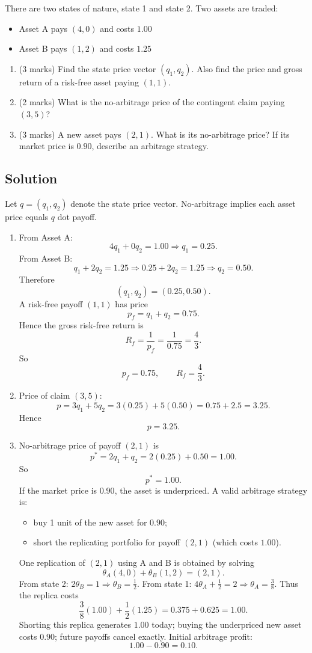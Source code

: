 \documentclass[12pt]{article}
\begin{document}
There are two states of nature, state 1 and state 2. Two assets are traded:
\begin{itemize}
\item Asset A pays $(4,0)$ and costs $1.00$
\item Asset B pays $(1,2)$ and costs $1.25$
\end{itemize}

\begin{enumerate}[label=(\alph*)]
\item (3 marks) Find the state price vector $(q_1,q_2)$. Also find the price and gross return of a risk-free asset paying $(1,1)$.
\item (2 marks) What is the no-arbitrage price of the contingent claim paying $(3,5)$?
\item (3 marks) A new asset pays $(2,1)$. What is its no-arbitrage price? If its market price is $0.90$, describe an arbitrage strategy.
\end{enumerate}

\subsection*{Solution}

Let $q=(q_1,q_2)$ denote the state price vector. No-arbitrage implies each asset price equals $q$ dot payoff.

\begin{enumerate}[label=(\alph*)]
\item From Asset A:
\[
4q_1+0q_2=1.00 \Rightarrow q_1=0.25.
\]
From Asset B:
\[
q_1+2q_2=1.25 \Rightarrow 0.25+2q_2=1.25 \Rightarrow q_2=0.50.
\]
Therefore
\[
\boxed{(q_1,q_2)=(0.25,0.50).}
\]
A risk-free payoff $(1,1)$ has price
\[
p_f=q_1+q_2=0.75.
\]
Hence the gross risk-free return is
\[
R_f=\frac{1}{p_f}=\frac{1}{0.75}=\frac43.
\]
So
\[
\boxed{p_f=0.75,\qquad R_f=\frac43.}
\]

\item Price of claim $(3,5)$:
\[
p=3q_1+5q_2=3(0.25)+5(0.50)=0.75+2.5=3.25.
\]
Hence
\[
\boxed{p=3.25.}
\]

\item No-arbitrage price of payoff $(2,1)$ is
\[
p^*=2q_1+q_2=2(0.25)+0.50=1.00.
\]
So
\[
\boxed{p^*=1.00.}
\]
If the market price is $0.90$, the asset is underpriced.
A valid arbitrage strategy is:
\begin{itemize}[leftmargin=*]
\item buy 1 unit of the new asset for $0.90$;
\item short the replicating portfolio for payoff $(2,1)$ (which costs $1.00$).
\end{itemize}
One replication of $(2,1)$ using A and B is obtained by solving
\[
\theta_A(4,0)+\theta_B(1,2)=(2,1).
\]
From state 2: $2\theta_B=1\Rightarrow \theta_B=\frac12$.
From state 1: $4\theta_A+\frac12=2\Rightarrow \theta_A=\frac38$.
Thus the replica costs
\[
\frac38(1.00)+\frac12(1.25)=0.375+0.625=1.00.
\]
Shorting this replica generates $1.00$ today; buying the underpriced new asset costs $0.90$; future payoffs cancel exactly.
Initial arbitrage profit:
\[
1.00-0.90=\boxed{0.10}.
\]
\end{enumerate}
\end{document}
